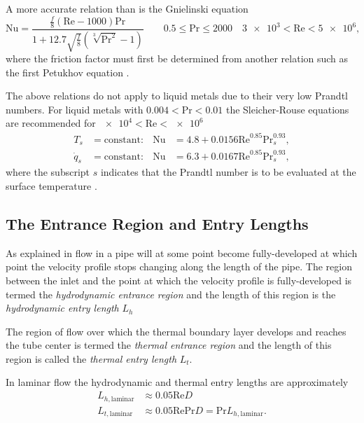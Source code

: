 A more accurate relation than  is the Gnielinski equation 
\begin{equation*}
  \mathrm{Nu} = \frac{\frac{f}{8} \left( \mathrm{Re} - \num{1000} \right) \mathrm{Pr}}{1 + \num{12,7} \sqrt{\frac{f}{8}} \left( \sqrt[3]{\mathrm{Pr}^2} - 1 \right)} \qquad \num{0,5} \leq \mathrm{Pr} \leq \num{2000} \quad \num{3e3} < \mathrm{Re} < \num{5e6} 
,\end{equation*}
where the friction factor must first be determined from another relation such as the first Petukhov equation .

The above relations do not apply to liquid metals due to their very low Prandtl numbers.
For liquid metals with $\num{0,004} < \mathrm{Pr} < \num{0,01}$ the Sleicher-Rouse equations are recommended for $\num{e4} < \mathrm{Re} < \num{e6}$ 
\begin{align*}
  T_s &= \text{constant}\colon & \mathrm{Nu} &= \num{4,8} + \num{0,0156} \mathrm{Re}^{\num{0,85}} \mathrm{Pr}^{\num{0,93}}_s, \\
  \dot{q}_s &= \text{constant}\colon & \mathrm{Nu} &= \num{6,3}  + \num{0,0167} \mathrm{Re}^{\num{0,85}} \mathrm{Pr}^{\num{0,93}}_s
,\end{align*}
where the subscript $s$ indicates that the Prandtl number is to be evaluated at the surface temperature .

\subsection{The Entrance Region and Entry Lengths}
As explained in  flow in a pipe will at some point become fully-developed at which point the velocity profile stops changing along the length of the pipe.
The region between the inlet and the point at which the velocity profile is fully-developed is termed the \textit{hydrodynamic entrance region} and the length of this region is the \textit{hydrodynamic entry length} $L_h$

The region of flow over which the thermal boundary layer develops and reaches the tube center is termed the \textit{thermal entrance region} and the length of this region is called the \textit{thermal entry length} $L_t$.

In laminar flow the hydrodynamic and thermal entry lengths are approximately 
\begin{align*}
  L_{h, \text{laminar}} &\approx \num{0,05} \mathrm{Re} D \\
  L_{t, \text{laminar}} &\approx \num{0,05}  \mathrm{Re} \mathrm{Pr} D = \mathrm{Pr} L_{h, \text{laminar}}
.\end{align*}

